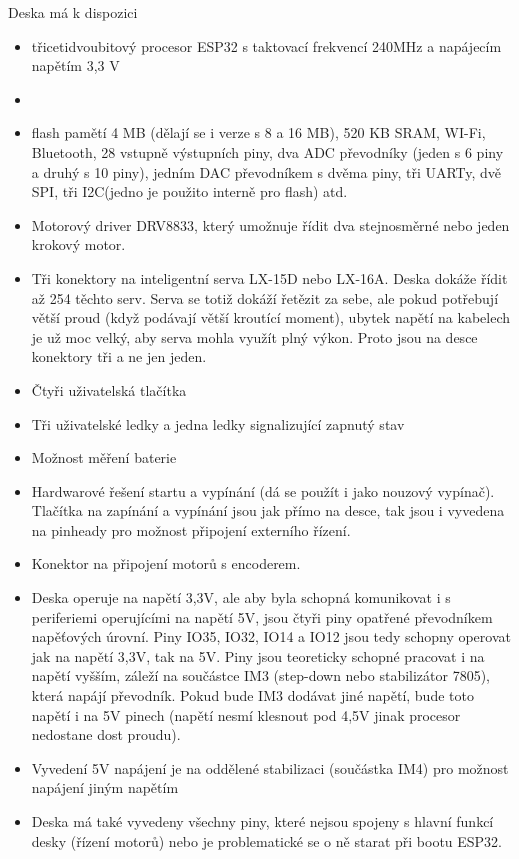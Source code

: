 \documentclass{template/socthesis}
\begin{document}
Deska má k dispozici

\begin{itemize}
	\item třicetidvoubitový procesor ESP32 s taktovací frekvencí 240MHz a napájecím napětím 3,3 V 
	\item \item flash pamětí 4 MB (dělají se i verze s 8 a 16 MB), 520 KB SRAM, WI-Fi, Bluetooth, 28 vstupně výstupních piny, dva ADC převodníky (jeden s 6 piny a druhý s 10 piny), jedním DAC převodníkem s dvěma piny, tři UARTy, dvě SPI, tři I2C(jedno je použito interně pro flash) atd.
	\item Motorový driver DRV8833, který umožnuje řídit dva stejnosměrné nebo jeden krokový motor.
	\item Tři konektory na inteligentní serva LX-15D nebo LX-16A. Deska dokáže řídit až 254 těchto serv. Serva se totiž dokáží řetězit za sebe, ale pokud potřebují větší proud (když podávají větší kroutící moment), ubytek napětí na kabelech je už moc velký, aby serva mohla využít plný výkon. Proto jsou na desce konektory tři a ne jen jeden.
	\item Čtyři uživatelská tlačítka
	\item Tři uživatelské ledky a jedna ledky signalizující zapnutý stav
	\item Možnost měření baterie
	\item Hardwarové řešení startu a vypínání (dá se použít i jako nouzový vypínač). Tlačítka na zapínání a vypínání jsou jak přímo na desce, tak jsou i vyvedena na pinheady pro možnost připojení externího řízení.
	\item Konektor na připojení motorů s encoderem.
	\item Deska operuje na napětí 3,3V, ale aby byla schopná komunikovat i s periferiemi operujícími
	na napětí 5V, jsou čtyři piny opatřené převodníkem napěťových úrovní.
	Piny IO35, IO32, IO14 a IO12 jsou tedy schopny operovat jak na napětí 3,3V, tak na 5V.
	Piny jsou teoreticky schopné pracovat i na napětí vyšším, záleží na součástce IM3
	(step-down nebo stabilizátor 7805), která napájí převodník. Pokud bude IM3 dodávat jiné napětí, bude toto napětí i na 5V pinech (napětí nesmí klesnout pod 4,5V jinak procesor nedostane dost proudu).
	\item Vyvedení 5V napájení je na oddělené stabilizaci (součástka IM4) pro možnost napájení jiným napětím
	\item Deska má také vyvedeny všechny piny, které nejsou spojeny 
	s hlavní funkcí desky (řízení motorů) nebo je problematické se o ně starat při bootu ESP32.
	\end{itemize}
\end{document}
